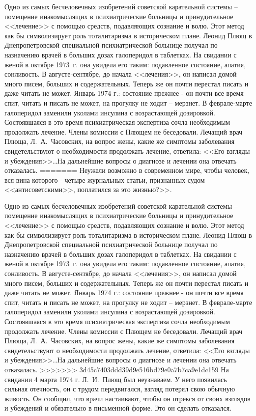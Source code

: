 \documentclass{book}
\begin{document}
Одно из самых бесчеловечных изобретений советской карательной системы -- помещение инакомыслящих в психиатрические больницы и принудительное <<лечение>> с помощью средств, подавляющих сознание и волю. Этот метод как бы символизирует роль тоталитаризма в историческом плане. Леонид Плющ в Днепропетровской специальной психиатрической больнице полу­чал по назначению врачей в больших дозах галоперидол в таблет­ках. На свидании с женой в октябре 1973~г. она увидела его та­ким: подавленное состояние, апатия, сонливость. В августе‑сен­тябре, до начала <<лечения>>, он написал домой много писем, боль­ших и содержательных. Теперь же он почти перестал писать и да­же читать не может. Январь 1974 г.: состояние прежнее ‑ он поч­ти все время спит, читать и писать не может, на прогулку не хо­дит -- мерзнет. В феврале‑марте галоперидол заменили уколами инсулина с возрастающей дозировкой. Состоявшаяся в это вре­мя психиатрическая экспертиза сочла необходимым продолжать лечение. Члены комиссии с Плющем не беседовали. Лечащий врач Плюща, Л.~А.~Часовских, на вопрос жены, какие же симптомы заболевания свидетельствуют о необходимости продолжать лечение, ответила: <<Его взгляды и убеждения>>\ldots На дальнейшие вопросы о диагнозе и лечении она отвечать отказалась.
=======
Неужели возможно в современном мире, чтобы человек, вся вина которого - четыре журнальных статьи, признанных судом <<антисоветскими>>, поплатился за это жизнью?>>.

Одно из самых бесчеловечных изобретений советской карательной системы -- помещение инакомыслящих в психиатрические больницы и принудительное <<лечение>> с помощью средств, подавляющих сознание и волю. Этот метод как бы символизирует роль тоталитаризма в историческом плане. Леонид Плющ в Днепропетровской специальной психиатрической больнице полу­чал по назначению врачей в больших дозах галоперидол в таблет­ках. На свидании с женой в октябре 1973~г. она увидела его та­ким: подавленное состояние, апатия, сонливость. В августе-сен­тябре, до начала <<лечения>>, он написал домой много писем, боль­ших и содержательных. Теперь же он почти перестал писать и да­же читать не может. Январь 1974 г.: состояние прежнее - он поч­ти все время спит, читать и писать не может, на прогулку не хо­дит -- мерзнет. В феврале-марте галоперидол заменили уколами инсулина с возрастающей дозировкой. Состоявшаяся в это вре­мя психиатрическая экспертиза сочла необходимым продолжать лечение. Члены комиссии с Плющем не беседовали. Лечащий врач 
Плюща, Л.~А.~Часовских, на вопрос жены, какие же симптомы заболевания свидетельствуют о необходимости продолжать лечение, ответила: <<Его взгляды и убеждения>>\ldots На дальнейшие вопросы о диагнозе и лечении она отвечать отказалась.
>>>>>>> 3d45c7403ddd39d9e516bd79e0a7b7ca9e1dc159
На свидании 4 марта 1974 г. Л.~И.~Плющ был неузнаваем. У него появилась сильная отечность, он с трудом передвигался, взгляд потерял свою обычную живость. Он сообщил, что врачи настаивают, чтобы он отрекся от своих взглядов и убеж­дений и обязательно в письменной форме. Это он сделать отказался.
\end{document}
